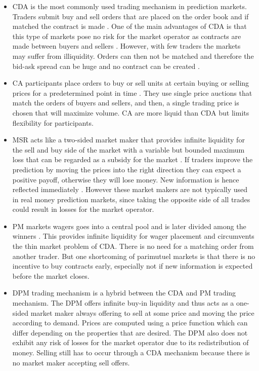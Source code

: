\documentclass{article}
\begin{document}
	\begin{itemize}
		\item CDA is the most commonly used trading mechanism in prediction markets. Traders submit buy and sell orders that are placed on the order book and if matched the contract is made \cite{Madhavan}. One of the main advantages of CDA is that this type of markets pose no risk for the market operator as contracts are made between buyers and sellers \cite{Spann}. However, with few traders the markets may suffer from illiquidity. Orders can then not be matched and therefore the bid-ask spread can be huge and no contract can be created \cite{Hanson}.
		
		\item CA participants place orders to buy or sell units at certain buying or selling prices for a predetermined point in time \cite{Madhavan}. They use single price auctions that match the orders of buyers and sellers, and then, a single trading price is chosen that will maximize volume. CA are more liquid than CDA but limits flexibility for participants.
		
		\item MSR acts like a two-sided market maker that provides infinite liquidity for the sell and buy side of the market with a variable but bounded maximum loss that can be regarded as a subsidy for the market \cite{Hanson}. If traders improve the prediction by moving the prices into the right direction they can expect a positive payoff, otherwise they will lose money. New information is hence reflected immediately \cite{Luckner}. However these market makers are not typically used in real money prediction markets, since taking the opposite side of all trades could result in losses for the market operator.
		
		\item PM markets wagers goes into a central pool and is later divided among the winners \cite{Pennock}. This provides infinite liquidity for wager placement and circumvents the thin market problem of CDA. There is no need for a matching order from another trader. But one shortcoming of parimutuel markets is that there is no incentive to buy contracts early, especially not if new information is expected before the market closes.
		
		\item DPM trading mechanism is a hybrid between the CDA and PM trading mechanism. The DPM offers infinite buy-in liquidity and thus acts as a one-sided market maker always offering to sell at some price and moving the price according to demand. Prices are computed using a price function which can differ depending on the properties that are desired. The DPM also does not exhibit any risk of losses for the market operator due to its redistribution of money. Selling still has to occur through a CDA mechanism because there is no market maker accepting sell offers.
	\end{itemize}
	
\end{document}
